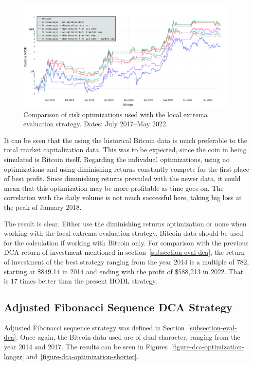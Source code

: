 \begin{figure}[!hbt]
    \centering
    \includegraphics[width=\columnwidth]{figures/evaluation-optimization-shorter.pdf}
    \caption{Comparison of risk optimizations used with the local extrema evaluation strategy. Dates: July 2017--May 2022.}
    \label{figure-optimization-shorter}
\end{figure}

It can be seen that the using the historical Bitcoin data is much preferable to the total market capitalization data. This was to be expected, since the coin in being simulated is Bitcoin itself. Regarding the individual optimizations, using no optimizations and using diminishing returns constantly compete for the first place of best profit. Since diminishing returns prevailed with the newer data, it could mean that this optimization may be more profitable as time goes on. The correlation with the daily volume is not much successful here, taking big loss at the peak of January 2018.

The result is clear. Either use the diminishing returns optimization or none when working with the local extrema evaluation strategy. Bitcoin data should be used for the calculation if working with Bitcoin only. For comparison with the previous DCA return of investment mentioned in section~\ref{subsection-eval-dca}, the return of investment of the best strategy ranging from the year 2014 is a multiple of 782, starting at \$849.14 in 2014 and ending with the profit of \$588,213 in 2022. That is 17 times better than the present HODL strategy.

\subsection*{Adjusted Fibonacci Sequence DCA Strategy}
Adjusted Fibonacci sequence strategy was defined in Section~\ref{subsection-eval-dca}. Once again, the Bitcoin data used are of dual character, ranging from the year 2014 and 2017. The results can be seen in Figures~\ref{figure-dca-optimization-longer} and~\ref{figure-dca-optimization-shorter}.

